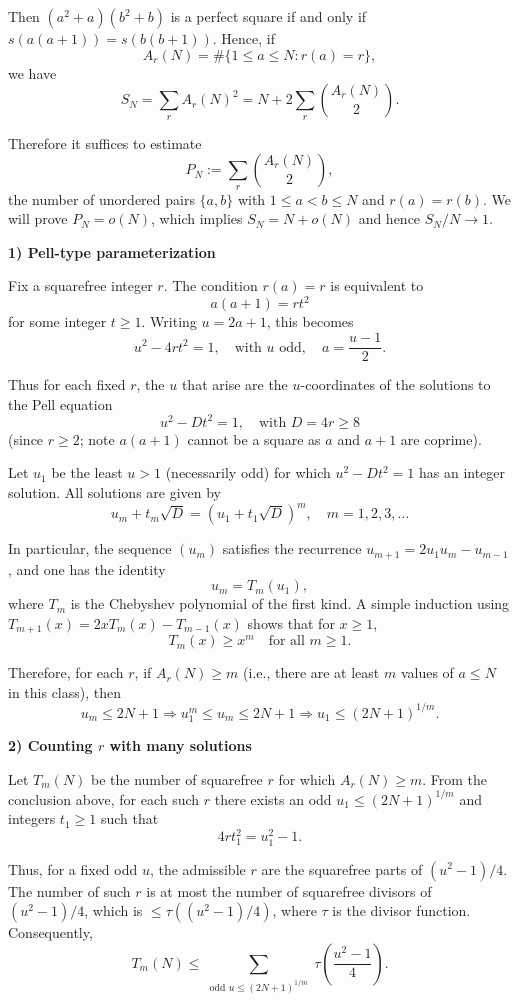 \documentclass[12pt,a4paper]{article}
\theoremstyle{definition}
\begin{document}
    Then $(a^2+a)(b^2+b)$ is a perfect square if and only if $s(a(a+1)) = s(b(b+1))$. Hence, if
    $$A_r(N) = \#\{1 \leq a \leq N : r(a) = r\},$$
    we have
    $$S_N = \sum_r A_r(N)^2 = N + 2\sum_r \binom{A_r(N)}{2}.$$

    Therefore it suffices to estimate
    $$P_N := \sum_r \binom{A_r(N)}{2},$$
    the number of unordered pairs $\{a,b\}$ with $1 \leq a < b \leq N$ and $r(a) = r(b)$. We will prove $P_N = o(N)$, which implies $S_N = N + o(N)$ and hence $S_N/N \to 1$.

    \textbf{1) Pell-type parameterization}

    Fix a squarefree integer $r$. The condition $r(a) = r$ is equivalent to
    $$a(a+1) = r t^2$$
    for some integer $t \geq 1$. Writing $u = 2a+1$, this becomes
    $$u^2 - 4r t^2 = 1, \quad \text{with } u \text{ odd}, \quad a = \frac{u-1}{2}.$$

    Thus for each fixed $r$, the $u$ that arise are the $u$-coordinates of the solutions to the Pell equation
    $$u^2 - D t^2 = 1, \quad \text{with } D = 4r \geq 8$$
    (since $r \geq 2$; note $a(a+1)$ cannot be a square as $a$ and $a+1$ are coprime).

    Let $u_1$ be the least $u > 1$ (necessarily odd) for which $u^2 - D t^2 = 1$ has an integer solution. All solutions are given by
    $$u_m + t_m\sqrt{D} = (u_1 + t_1\sqrt{D})^m, \quad m = 1,2,3,\ldots$$

    In particular, the sequence $(u_m)$ satisfies the recurrence $u_{m+1} = 2u_1 u_m - u_{m-1}$, and one has the identity
    $$u_m = T_m(u_1),$$
    where $T_m$ is the Chebyshev polynomial of the first kind. A simple induction using $T_{m+1}(x) = 2x T_m(x) - T_{m-1}(x)$ shows that for $x \geq 1$,
    $$T_m(x) \geq x^m \quad \text{for all } m \geq 1.$$

    Therefore, for each $r$, if $A_r(N) \geq m$ (i.e., there are at least $m$ values of $a \leq N$ in this class), then
    $$u_m \leq 2N + 1 \Rightarrow u_1^m \leq u_m \leq 2N+1 \Rightarrow u_1 \leq (2N+1)^{1/m}.$$

    \textbf{2) Counting $r$ with many solutions}

    Let $T_m(N)$ be the number of squarefree $r$ for which $A_r(N) \geq m$. From the conclusion above, for each such $r$ there exists an odd $u_1 \leq (2N+1)^{1/m}$ and integers $t_1 \geq 1$ such that
    $$4r t_1^2 = u_1^2 - 1.$$

    Thus, for a fixed odd $u$, the admissible $r$ are the squarefree parts of $(u^2 - 1)/4$. The number of such $r$ is at most the number of squarefree divisors of $(u^2 - 1)/4$, which is $\leq \tau((u^2 - 1)/4)$, where $\tau$ is the divisor function. Consequently,
    $$T_m(N) \leq \sum_{\substack{\text{odd } u \leq (2N+1)^{1/m}}} \tau\left(\frac{u^2 - 1}{4}\right).$$
\end{document}
